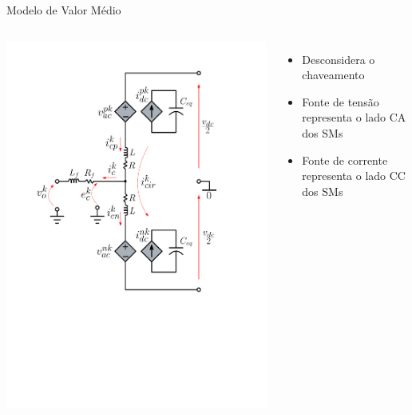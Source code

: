 \begin{frame}{Modelo de Valor Médio}



\begin{columns}


\centering
\includegraphics[width=0.9\linewidth]{./figuras/figuras_MMC/MMC_avg_2}

\centering


\begin{itemize}
	\item Desconsidera o chaveamento\\[20pt]
	\item Fonte de tensão representa o lado CA dos SMs\\[20pt]
	\item Fonte de corrente representa o lado CC dos SMs
\end{itemize}


\end{columns}
\end{frame}
